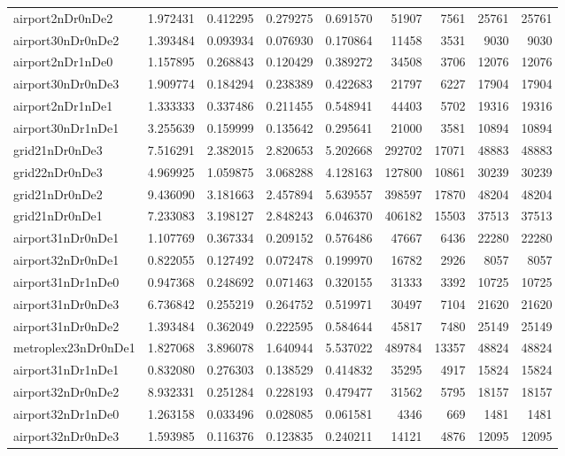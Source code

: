 \begin{longtable}{|l|r|r|r|r|r|r|r|r|}
airport2nDr0nDe2 & 1.972431 & 0.412295 & 0.279275 & 0.691570 & 51907 & 7561 & 25761 & 25761 \\
airport30nDr0nDe2 & 1.393484 & 0.093934 & 0.076930 & 0.170864 & 11458 & 3531 & 9030 & 9030 \\
airport2nDr1nDe0 & 1.157895 & 0.268843 & 0.120429 & 0.389272 & 34508 & 3706 & 12076 & 12076 \\
airport30nDr0nDe3 & 1.909774 & 0.184294 & 0.238389 & 0.422683 & 21797 & 6227 & 17904 & 17904 \\
airport2nDr1nDe1 & 1.333333 & 0.337486 & 0.211455 & 0.548941 & 44403 & 5702 & 19316 & 19316 \\
airport30nDr1nDe1 & 3.255639 & 0.159999 & 0.135642 & 0.295641 & 21000 & 3581 & 10894 & 10894 \\
grid21nDr0nDe3 & 7.516291 & 2.382015 & 2.820653 & 5.202668 & 292702 & 17071 & 48883 & 48883 \\
grid22nDr0nDe3 & 4.969925 & 1.059875 & 3.068288 & 4.128163 & 127800 & 10861 & 30239 & 30239 \\
grid21nDr0nDe2 & 9.436090 & 3.181663 & 2.457894 & 5.639557 & 398597 & 17870 & 48204 & 48204 \\
grid21nDr0nDe1 & 7.233083 & 3.198127 & 2.848243 & 6.046370 & 406182 & 15503 & 37513 & 37513 \\
airport31nDr0nDe1 & 1.107769 & 0.367334 & 0.209152 & 0.576486 & 47667 & 6436 & 22280 & 22280 \\
airport32nDr0nDe1 & 0.822055 & 0.127492 & 0.072478 & 0.199970 & 16782 & 2926 & 8057 & 8057 \\
airport31nDr1nDe0 & 0.947368 & 0.248692 & 0.071463 & 0.320155 & 31333 & 3392 & 10725 & 10725 \\
airport31nDr0nDe3 & 6.736842 & 0.255219 & 0.264752 & 0.519971 & 30497 & 7104 & 21620 & 21620 \\
airport31nDr0nDe2 & 1.393484 & 0.362049 & 0.222595 & 0.584644 & 45817 & 7480 & 25149 & 25149 \\
metroplex23nDr0nDe1 & 1.827068 & 3.896078 & 1.640944 & 5.537022 & 489784 & 13357 & 48824 & 48824 \\
airport31nDr1nDe1 & 0.832080 & 0.276303 & 0.138529 & 0.414832 & 35295 & 4917 & 15824 & 15824 \\
airport32nDr0nDe2 & 8.932331 & 0.251284 & 0.228193 & 0.479477 & 31562 & 5795 & 18157 & 18157 \\
airport32nDr1nDe0 & 1.263158 & 0.033496 & 0.028085 & 0.061581 & 4346 & 669 & 1481 & 1481 \\
airport32nDr0nDe3 & 1.593985 & 0.116376 & 0.123835 & 0.240211 & 14121 & 4876 & 12095 & 12095 \\

\end{longtable}

